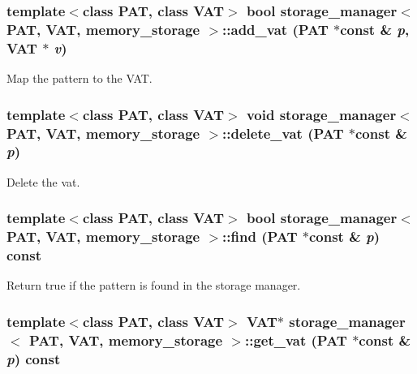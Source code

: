 \subsubsection{\setlength{\rightskip}{0pt plus 5cm}template$<$class PAT, class VAT$>$ bool {\bf storage\_\-manager}$<$ PAT, VAT, {\bf memory\_\-storage} $>$::add\_\-vat (PAT $\ast$const \& {\em p}, VAT $\ast$ {\em v})\hspace{0.3cm}{\tt  [inline]}}\label{classstorage__manager_3_01PAT_00_01VAT_00_01memory__storage_01_4_a5}


Map the pattern to the VAT. 
\subsubsection{\setlength{\rightskip}{0pt plus 5cm}template$<$class PAT, class VAT$>$ void {\bf storage\_\-manager}$<$ PAT, VAT, {\bf memory\_\-storage} $>$::delete\_\-vat (PAT $\ast$const \& {\em p})\hspace{0.3cm}{\tt  [inline]}}\label{classstorage__manager_3_01PAT_00_01VAT_00_01memory__storage_01_4_a4}


Delete the vat. 
\subsubsection{\setlength{\rightskip}{0pt plus 5cm}template$<$class PAT, class VAT$>$ bool {\bf storage\_\-manager}$<$ PAT, VAT, {\bf memory\_\-storage} $>$::find (PAT $\ast$const \& {\em p}) const\hspace{0.3cm}{\tt  [inline]}}\label{classstorage__manager_3_01PAT_00_01VAT_00_01memory__storage_01_4_a2}


Return true if the pattern is found in the storage manager. 
\subsubsection{\setlength{\rightskip}{0pt plus 5cm}template$<$class PAT, class VAT$>$ VAT$\ast$ {\bf storage\_\-manager}$<$ PAT, VAT, {\bf memory\_\-storage} $>$::get\_\-vat (PAT $\ast$const \& {\em p}) const\hspace{0.3cm}{\tt  [inline]}}\label{classstorage__manager_3_01PAT_00_01VAT_00_01memory__storage_01_4_a3}


